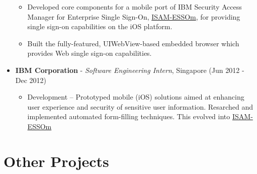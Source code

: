\begin{itemize}
  \begin{itemize}
  \tightlist
  \item
    Developed core components for a mobile port of IBM Security Access
    Manager for Enterprise Single Sign-On,
    \href{https://itunes.apple.com/us/app/isam-essom/id741972716?mt=8}{ISAM-ESSOm},
    for providing single sign-on capabilities on the iOS platform.
  \item
    Built the fully-featured, UIWebView-based embedded browser which
    provides Web single sign-on capabilities.
  \end{itemize}
\item
  \textbf{IBM Corporation} - \emph{Software Engineering Intern},
  Singapore \hfill (Jun 2012 - Dec 2012)

  \begin{itemize}
  \tightlist
  \item
    Development -- Prototyped mobile (iOS) solutions aimed at enhancing
    user experience and security of sensitive user information.
    Resarched and implemented automated form-filling techniques. This
    evolved into
    \href{https://itunes.apple.com/us/app/isam-essom/id741972716?mt=8}{ISAM-ESSOm}
  \end{itemize}
\end{itemize}

\section{Other Projects}\label{other-projects}

